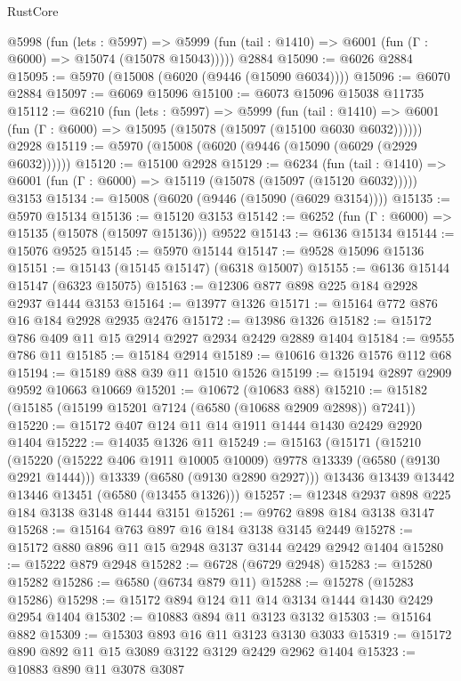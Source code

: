 \begin{lexlean}{RustCore}
\begin{coremodule}
{\begin{coremodule}
{{{{{{{{{{{{{{{{{{{{{{{{{{{{{{{{{{{{{{{{{{{{{    @5998
      (fun (lets : @5997) =>
      @5999 (fun (tail : @1410) => @6001 (fun (Γ : @6000) => @15074 (@15078 @15043)))))
    @2884
@15090 := @6026 @2884
@15095 := @5970 (@15008 (@6020 (@9446 (@15090 @6034))))
@15096 := @6070 @2884
@15097 := @6069 @15096
@15100 := @6073 @15096 @15038 @11735
@15112 := @6210
    (fun (lets : @5997) =>
    @5999
      (fun (tail : @1410) =>
      @6001 (fun (Γ : @6000) => @15095 (@15078 (@15097 (@15100 @6030 @6032))))))
    @2928
@15119 := @5970 (@15008 (@6020 (@9446 (@15090 (@6029 (@2929 @6032))))))
@15120 := @15100 @2928
@15129 := @6234
    (fun (tail : @1410) => @6001 (fun (Γ : @6000) => @15119 (@15078 (@15097 (@15120 @6032)))))
    @3153
@15134 := @15008 (@6020 (@9446 (@15090 (@6029 @3154))))
@15135 := @5970 @15134
@15136 := @15120 @3153
@15142 := @6252 (fun (Γ : @6000) => @15135 (@15078 (@15097 @15136))) @9522
@15143 := @6136 @15134
@15144 := @15076 @9525
@15145 := @5970 @15144
@15147 := @9528 @15096 @15136
@15151 := @15143 (@15145 @15147) (@6318 @15007)
@15155 := @6136 @15144 @15147 (@6323 @15075)
@15163 := @12306 @877 @898 @225 @184 @2928 @2937 @1444 @3153
@15164 := @13977 @1326
@15171 := @15164 @772 @876 @16 @184 @2928 @2935 @2476
@15172 := @13986 @1326
@15182 := @15172 @786 @409 @11 @15 @2914 @2927 @2934 @2429 @2889 @1404
@15184 := @9555 @786 @11
@15185 := @15184 @2914
@15189 := @10616 @1326 @1576 @112 @68
@15194 := @15189 @88 @39 @11 @1510 @1526
@15199 := @15194 @2897 @2909 @9592 @10663 @10669
@15201 := @10672 (@10683 @88)
@15210 := @15182 (@15185 (@15199 @15201 @7124 (@6580 (@10688 @2909 @2898)) @7241))
@15220 := @15172 @407 @124 @11 @14 @1911 @1444 @1430 @2429 @2920 @1404
@15222 := @14035 @1326 @11
@15249 := @15163
    (@15171
      (@15210
        (@15220 (@15222 @406 @1911 @10005 @10009) @9778 @13339 (@6580 (@9130 @2921 @1444)))
        @13339
        (@6580 (@9130 @2890 @2927)))
      @13436
      @13439
      @13442
      @13446
      @13451
      (@6580 (@13455 @1326)))
@15257 := @12348 @2937 @898 @225 @184 @3138 @3148 @1444 @3151
@15261 := @9762 @898 @184 @3138 @3147
@15268 := @15164 @763 @897 @16 @184 @3138 @3145 @2449
@15278 := @15172 @880 @896 @11 @15 @2948 @3137 @3144 @2429 @2942 @1404
@15280 := @15222 @879 @2948
@15282 := @6728 (@6729 @2948)
@15283 := @15280 @15282
@15286 := @6580 (@6734 @879 @11)
@15288 := @15278 (@15283 @15286)
@15298 := @15172 @894 @124 @11 @14 @3134 @1444 @1430 @2429 @2954 @1404
@15302 := @10883 @894 @11 @3123 @3132
@15303 := @15164 @882
@15309 := @15303 @893 @16 @11 @3123 @3130 @3033
@15319 := @15172 @890 @892 @11 @15 @3089 @3122 @3129 @2429 @2962 @1404
@15323 := @10883 @890 @11 @3078 @3087
}}}}}}}}}}}}}}}}}}}}}}}}}}}}}}}}}}}}}}}}}}}}}
\end{coremodule}}
\end{coremodule}
\end{lexlean}
